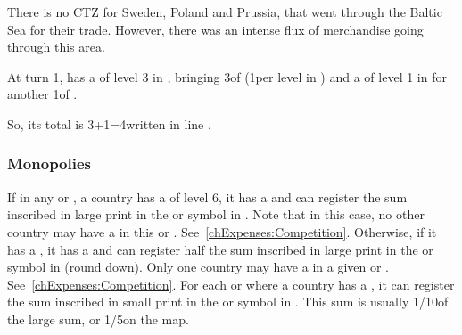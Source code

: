 \begin{designnote}
  There is no CTZ for Sweden, Poland and Prussia, that went through the
  Baltic Sea for their trade. However, there was an intense flux of
  merchandise going through this area.
\end{designnote}


\begin{exemple}
  At turn 1, \POR has a \TradeFLEET of level 3 in ,
  bringing 3\ducats of  (1\ducats per level in \STZ)
  and a \TradeFLEET of level 1 in  for another 1\ducats of
  .

  So, its total  is 3+1=4\ducats written in
  line .
\end{exemple}

\subsubsection{Monopolies}
\aparag If in any \CTZ or \STZ, a country has a \TradeFLEET of level 6,
it has a  and can register the sum inscribed in
large print in the \CTZ or \STZ symbol in .
\bparag Note that in this case, no other country may have a \TradeFLEET
in this \CTZ or \STZ. See~\ref{chExpenses:Competition}.
\aparag Otherwise, if it has a \TradeFLEET\faceplus, it has a
 and can register half the sum inscribed in
large print in the \CTZ or \STZ symbol in  (round down).
\bparag Only one country may have a \TradeFLEET\faceplus in a given \CTZ
or \STZ. See~\ref{chExpenses:Competition}.
\aparag For each \CTZ or \STZ where a country has a
\TradeFLEET\facemoins, it can register the sum inscribed in small print
in the \CTZ or \STZ symbol in .
\bparag This sum is usually 1/10\th of the large sum, or 1/5\th on the
\ROTW map.

